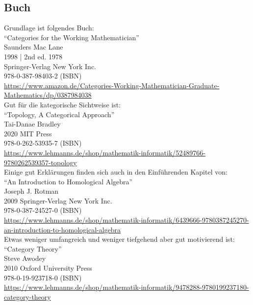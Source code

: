 \documentclass[a4paper]{amsart}
\theoremstyle{definition}
\begin{document}
\subsection*{Buch}
Grundlage ist folgendes Buch:\\
"`Categories for the Working Mathematician"'\\
Saunders Mac Lane\\
1998 | 2nd ed. 1978\\
Springer-Verlag New York Inc.\\
978-0-387-98403-2 (ISBN)\\
{\tiny
   \url{https://www.amazon.de/Categories-Working-Mathematician-Graduate-Mathematics/dp/0387984038}}\\

Gut für die kategorische Sichtweise ist:\\
"`Topology, A Categorical Approach"'\\
Tai-Danae Bradley\\
2020 MIT Press\\
978-0-262-53935-7 (ISBN)\\ 
{\tiny
\url{https://www.lehmanns.de/shop/mathematik-informatik/52489766-9780262539357-topology}}\\

Einige gut Erklärungen finden sich auch in den Einführenden Kapitel von:\\
"`An Introduction to Homological Algebra"'\\
Joseph J. Rotman\\
2009 Springer-Verlag New York Inc.\\
978-0-387-24527-0 (ISBN)\\ 
{\tiny \url{https://www.lehmanns.de/shop/mathematik-informatik/6439666-9780387245270-an-introduction-to-homological-algebra}}\\

Etwas weniger umfangreich und weniger tiefgehend aber gut motivierend ist:
"`Category Theory"'\\
Steve Awodey\\
2010 Oxford University Press\\
978-0-19-923718-0 (ISBN)\\
{\tiny\url{https://www.lehmanns.de/shop/mathematik-informatik/9478288-9780199237180-category-theory}}\\
\end{document}

